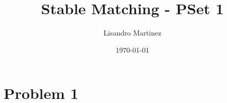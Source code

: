 \documentclass[12pt, fleqn]{article}
\title{Stable Matching - PSet 1}
\author{Lisandro Martinez}
\date{\today}
\begin{document}
    \maketitle
    \section*{Problem 1}
        
\end{document}
